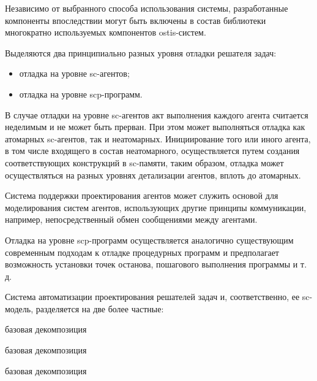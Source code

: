 Независимо от выбранного способа использования системы, разработанные компоненты впоследствии могут быть включены в состав библиотеки многократно используемых компонентов ostis-систем.

Выделяются два принципиально разных уровня отладки решателя задач:
\begin{itemize}
    \item отладка на уровне sc-агентов;
    \item отладка на уровне scp-программ.
\end{itemize}

В случае отладки на уровне sc-агентов акт выполнения каждого агента считается неделимым и не может быть прерван. При этом может выполняться отладка как атомарных sc-агентов, так и неатомарных. Инициирование того или иного агента, в том числе входящего в состав неатомарного, осуществляется путем создания соответствующих конструкций в sc-памяти, таким образом, отладка может осуществляться на разных уровнях детализации агентов, вплоть до атомарных.

Система поддержки проектирования агентов может служить основой для моделирования систем агентов, использующих другие принципы коммуникации, например, непосредственный обмен сообщениями между агентами.

Отладка на уровне scp-программ осуществляется аналогично существующим современным подходам к отладке процедурных программ и предполагает возможность установки точек останова, пошагового выполнения программы и т. д.

Система автоматизации проектирования решателей задач и, соответственно, ее sc-модель, разделяется на две более частные:

\begin{SCn}
\begin{scnreltoset}{базовая декомпозиция}
\begin{scnindent}
    \begin{scnreltoset}{базовая декомпозиция}
    \end{scnreltoset}
\end{scnindent}
\begin{scnindent}
    \begin{scnreltoset}{базовая декомпозиция}
    \end{scnreltoset}
\end{scnindent}
\end{scnreltoset}
\end{SCn}

